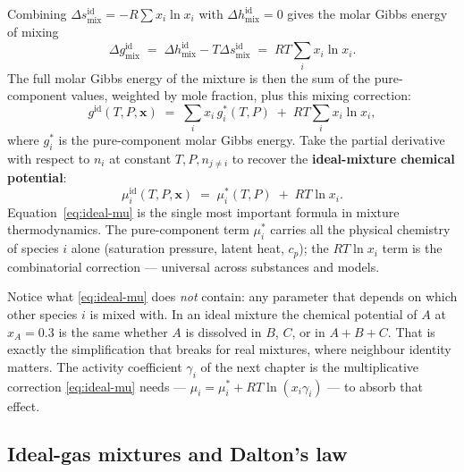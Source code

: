 \documentclass[11pt,a4paper]{article}
\begin{document}
Combining $\Delta s_{\mathrm{mix}}^{\mathrm{id}} =
- R \sum x_i \ln x_i$ with $\Delta h_{\mathrm{mix}}^{\mathrm{id}} = 0$
gives the molar Gibbs energy of mixing
\begin{equation}
   \Delta g_{\mathrm{mix}}^{\mathrm{id}}
   \;=\; \Delta h_{\mathrm{mix}}^{\mathrm{id}}
        - T \Delta s_{\mathrm{mix}}^{\mathrm{id}}
   \;=\; RT \sum_i x_i \ln x_i.
   \label{eq:ideal-gmix}
\end{equation}
The full molar Gibbs energy of the mixture is then the sum of the
pure-component values, weighted by mole fraction, plus this mixing
correction:
\begin{equation}
   g^{\mathrm{id}}(T,P,\mathbf{x})
   \;=\; \sum_i x_i\, g_i^{*}(T,P)
        \;+\; RT \sum_i x_i \ln x_i,
\end{equation}
where $g_i^{*}$ is the pure-component molar Gibbs energy.  Take the
partial derivative with respect to $n_i$ at constant $T, P, n_{j
\neq i}$ to recover the \textbf{ideal-mixture chemical potential}:
\begin{equation}
   \boxed{\;
   \mu_i^{\mathrm{id}}(T, P, \mathbf{x})
   \;=\; \mu_i^{*}(T, P) \;+\; RT \ln x_i.
   \;}
   \label{eq:ideal-mu}
\end{equation}
Equation~\eqref{eq:ideal-mu} is the single most important formula in
mixture thermodynamics.  The pure-component term $\mu_i^*$ carries
all the physical chemistry of species $i$ alone (saturation pressure,
latent heat, $c_p$); the $RT \ln x_i$ term is the combinatorial
correction --- universal across substances and models.

\begin{intuition}
Notice what \eqref{eq:ideal-mu} does \emph{not} contain: any
parameter that depends on which other species $i$ is mixed with.
In an ideal mixture the chemical potential of $A$ at $x_A = 0.3$ is
the same whether $A$ is dissolved in $B$, $C$, or in $A + B + C$.
That is exactly the simplification that breaks for real mixtures,
where neighbour identity matters.  The activity coefficient
$\gamma_i$ of the next chapter is the multiplicative correction
\eqref{eq:ideal-mu} needs --- $\mu_i = \mu_i^* + RT \ln(x_i
\gamma_i)$ --- to absorb that effect.
\end{intuition}

\subsection{Ideal-gas mixtures and Dalton's law}
\end{document}

